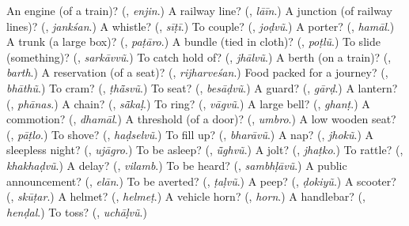 \begin{tcolorbox}[breakable,colback=teal!4,colframe=teal!35!black,title={Before you move on}]
An engine (of a train)? (\textbf{}, \emph{enjin}.) A railway line? (\textbf{}, \emph{lāīn}.) A junction (of railway lines)? (\textbf{}, \emph{jankśan}.) A whistle? (\textbf{}, \emph{sīṭī}.) To couple? (\textbf{}, \emph{joḍvũ}.) A porter? (\textbf{}, \emph{hamāl}.) A trunk (a large box)? (\textbf{}, \emph{paṭāro}.) A bundle (tied in cloth)? (\textbf{}, \emph{poṭlũ}.) To slide (something)? (\textbf{}, \emph{sarkāvvũ}.) To catch hold of? (\textbf{}, \emph{jhālvũ}.) A berth (on a train)? (\textbf{}, \emph{barth}.) A reservation (of a seat)? (\textbf{}, \emph{rijharveśan}.) Food packed for a journey? (\textbf{}, \emph{bhāthũ}.) To cram? (\textbf{}, \emph{ṭhā̃svũ}.) To seat? (\textbf{}, \emph{besāḍvũ}.) A guard? (\textbf{}, \emph{gārḍ}.) A lantern? (\textbf{}, \emph{phānas}.) A chain? (\textbf{}, \emph{sā̃kaḷ}.) To ring? (\textbf{}, \emph{vāgvũ}.) A large bell? (\textbf{}, \emph{ghanṭ}.) A commotion? (\textbf{}, \emph{dhamāl}.) A threshold (of a door)? (\textbf{}, \emph{umbro}.) A low wooden seat? (\textbf{}, \emph{pāṭlo}.) To shove? (\textbf{}, \emph{haḍselvũ}.) To fill up? (\textbf{}, \emph{bharāvũ}.) A nap? (\textbf{}, \emph{jhokũ}.) A sleepless night? (\textbf{}, \emph{ujāgro}.) To be asleep? (\textbf{}, \emph{ū̃ghvũ}.) A jolt? (\textbf{}, \emph{jhaṭko}.) To rattle? (\textbf{}, \emph{khakhaḍvũ}.) A delay? (\textbf{}, \emph{vilamb}.) To be heard? (\textbf{}, \emph{sambhḷāvũ}.) A public announcement? (\textbf{}, \emph{elān}.) To be averted? (\textbf{}, \emph{ṭaḷvũ}.) A peep? (\textbf{}, \emph{ḍokiyũ}.) A scooter? (\textbf{}, \emph{skūṭar}.) A helmet? (\textbf{}, \emph{helmeṭ}.) A vehicle horn? (\textbf{}, \emph{horn}.) A handlebar? (\textbf{}, \emph{henḍal}.) To toss? (\textbf{}, \emph{uchāḷvũ}.)
\end{tcolorbox}
